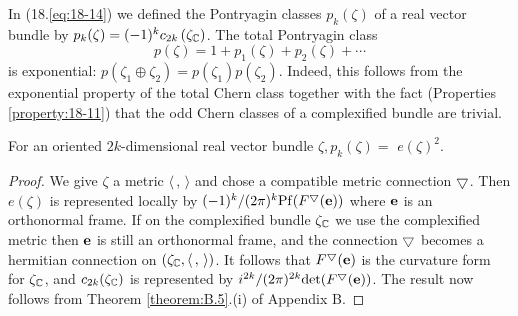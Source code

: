 In (18.\ref{eq:18-14}) we defined the Pontryagin classes $p_{k}(\zeta)$ of a real vector bundle 
by $p_{k}(\zeta)=(-1)^{k} c_{2 k}\left(\zeta_{\mathbb{C}}\right)$. The total Pontryagin class
\begin{equation}\label{eq:19-7}
  p(\zeta)=1+p_{1}(\zeta)+p_{2}(\zeta)+\cdots
\end{equation}
is exponential: $p\left(\zeta_{1} \oplus \zeta_{2}\right)=p\left(\zeta_{1}\right) p\left(\zeta_{2}\right)$. 
Indeed, this follows from the exponential property of the total Chern class together with the fact (Properties \ref{property:18-11}) 
that the odd Chern classes of a complexified bundle are trivial.


\begin{proposition}\label{proposition:19-9}
  For an oriented $2 k$-dimensional real vector bundle $\zeta, p_{k}(\zeta)=$ $e(\zeta)^{2}$.
\end{proposition}


\begin{proof}
  We give $\zeta$ a metric $\langle\,,\,\rangle$ and chose a compatible metric connection $\bigtriangledown$. 
  Then $e(\zeta)$ is represented locally by $(-1)^{k} /(2 \pi)^{k} \mathrm{Pf}(F^\bigtriangledown(\mathbf{e}))$ 
  where $\mathbf{e}$ is an orthonormal frame. If on the complexified bundle $\zeta_{\mathbb{C}}$ we use 
  the complexified metric then $\mathbf{e}$ is still an orthonormal frame, and the connection $\bigtriangledown$ 
  becomes a hermitian connection on $\left(\zeta_{\mathbb{C}},\langle\,,\,\rangle\right)$. It follows 
  that $F^\bigtriangledown(\mathbf{e})$ is the curvature form for $\zeta_{{\mathbb{C}}}$, and $c_{2k}(\zeta_{\mathbb{C}})$ 
  is represented by $i^{2 k} /(2 \pi)^{2 k} \mathrm{det}(F^\bigtriangledown(\mathbf{e}))$. The result now follows from 
  Theorem \ref{theorem:B.5}.(i) of Appendix B.
\end{proof}